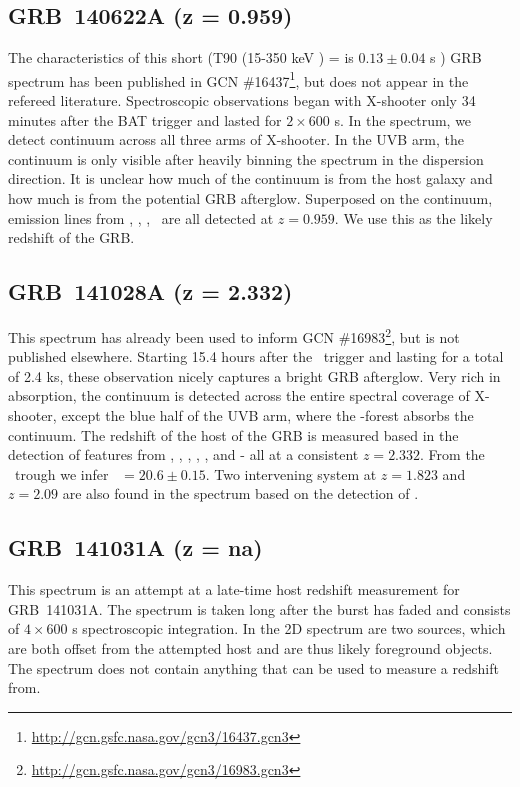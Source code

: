 \documentclass{aa}    %
\begin{document}
\subsection{GRB~140622A (z = 0.959)}	

The characteristics of this short (T90 (15-350 keV ) = is $0.13 \pm 0.04$ s
\citep{Lien2016}) GRB spectrum has been published in GCN
\#16437\footnote{\url{http://gcn.gsfc.nasa.gov/gcn3/16437.gcn3}}, but does not
appear in the refereed literature. Spectroscopic observations began with
X-shooter only 34 minutes after the BAT trigger and lasted for $2\times600$ s.
In the spectrum, we detect continuum across all three arms of X-shooter. In the
UVB arm, the continuum is only visible after heavily binning the spectrum in the
dispersion direction. It is unclear how much of the continuum is from the host
galaxy and how much is from the potential GRB afterglow. Superposed on the
continuum, emission lines from \oii, \hb, \oiii, \ha~are all detected at $z =
0.959$. We use this as the likely redshift of the GRB.

\subsection{GRB~141028A (z = 2.332)}	

This spectrum has already been used to inform GCN
\#16983\footnote{\url{http://gcn.gsfc.nasa.gov/gcn3/16983.gcn3}}, but is not
published elsewhere. Starting 15.4 hours after the \swift~trigger and lasting
for a total of 2.4 ks, these observation nicely captures a bright GRB afterglow.
Very rich in absorption, the continuum is detected across the entire spectral
coverage of X-shooter, except the blue half of the UVB arm, where the
\lya-forest absorbs the continuum. The redshift of the host of the GRB is
measured based in the detection of features from \lya, \SIii, \civ, \cii, \feii,
and \mgii - all at a consistent $z = 2.332$. From the \lya~trough we infer
\nh~$=20.6 \pm 0.15$. Two intervening system at $z = 1.823$ and $z = 2.09$ are
also found in the spectrum based on the detection of \civ.

\subsection{GRB~141031A  (z = na)}	

This spectrum is an attempt at a late-time host redshift measurement for
GRB~141031A. The spectrum is taken long after the burst has faded and consists
of $4\times600$ s spectroscopic integration. In the 2D spectrum are two sources,
which are both offset from the attempted host and are thus likely foreground
objects. The spectrum does not contain anything that can be used to measure a
redshift from.
\end{document}
